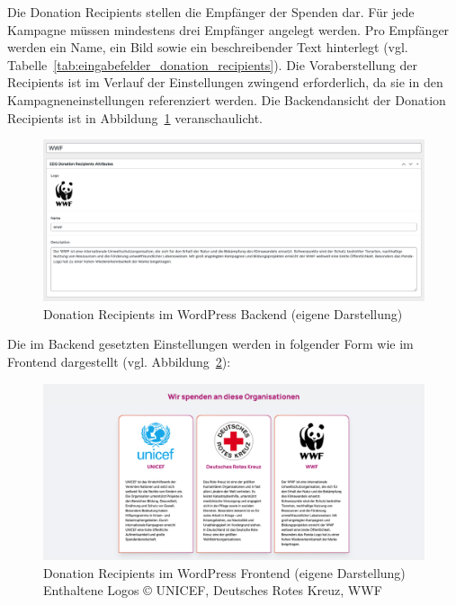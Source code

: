 Die Donation Recipients stellen die Empfänger der Spenden dar.
Für jede Kampagne müssen mindestens drei Empfänger angelegt werden.
Pro Empfänger werden ein Name, ein Bild sowie ein beschreibender Text hinterlegt (vgl. Tabelle~\ref{tab:eingabefelder_donation_recipients}).
Die Voraberstellung der Recipients ist im Verlauf der Einstellungen zwingend erforderlich, da sie in den Kampagneneinstellungen referenziert werden.
Die Backendansicht der Donation Recipients ist in Abbildung~\ref{fig:donation-recipients-settings-legacy} veranschaulicht.
\begin{figure}[H]
    \centering
    \includegraphics[width=1\textwidth]{images/legacy_donation_recipients_backend}
    \caption{Donation Recipients im WordPress Backend (eigene Darstellung)}
    \label{fig:donation-recipients-settings-legacy}
\end{figure}
Die im Backend gesetzten Einstellungen werden in folgender Form wie im Frontend dargestellt (vgl. Abbildung~\ref{fig:donation-recipients-frontend-legacy}):
\begin{figure}[H]
    \centering
    \includegraphics[width=1\textwidth]{images/legacy_donation_recipients_frontend}
    \caption{Donation Recipients im WordPress Frontend (eigene Darstellung)\\Enthaltene Logos © UNICEF, Deutsches Rotes Kreuz, WWF \cite{ngo_logos}}
    \label{fig:donation-recipients-frontend-legacy}
\end{figure}

